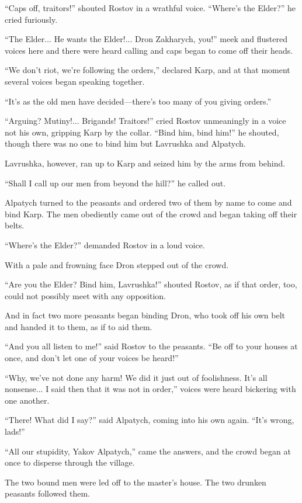 ``Caps off, traitors!'' shouted Rostov in a wrathful
voice. ``Where's the Elder?'' he cried furiously.

``The Elder... He wants the Elder!... Dron Zakharych, you!'' meek
and flustered voices here and there were heard calling and caps
began to come off their heads.

``We don't riot, we're following the orders,'' declared Karp, and
at that moment several voices began speaking together.

``It's as the old men have decided---there's too many of you
giving orders.''

``Arguing? Mutiny!... Brigands! Traitors!'' cried Rostov
unmeaningly in a voice not his own, gripping Karp by the
collar. ``Bind him, bind him!'' he shouted, though there was no
one to bind him but Lavrushka and Alpatych.

Lavrushka, however, ran up to Karp and seized him by the arms
from behind.

``Shall I call up our men from beyond the hill?'' he called out.

Alpatych turned to the peasants and ordered two of them by name
to come and bind Karp. The men obediently came out of the crowd
and began taking off their belts.

``Where's the Elder?'' demanded Rostov in a loud voice.

With a pale and frowning face Dron stepped out of the crowd.

``Are you the Elder? Bind him, Lavrushka!'' shouted Rostov, as if
that order, too, could not possibly meet with any opposition.

And in fact two more peasants began binding Dron, who took off
his own belt and handed it to them, as if to aid them.

``And you all listen to me!'' said Rostov to the peasants. ``Be
off to your houses at once, and don't let one of your voices be
heard!''

``Why, we've not done any harm! We did it just out of
foolishness. It's all nonsense... I said then that it was not in
order,'' voices were heard bickering with one another.

``There! What did I say?'' said Alpatych, coming into his own
again. ``It's wrong, lads!''

``All our stupidity, Yakov Alpatych,'' came the answers, and the
crowd began at once to disperse through the village.

The two bound men were led off to the master's house. The two
drunken peasants followed them.

